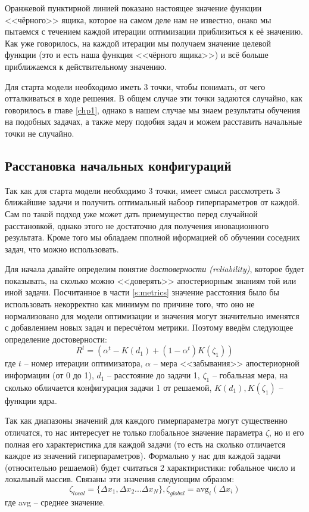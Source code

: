 \documentclass[times,specification,annotation]{itmo-student-thesis}
\begin{document}
	Оранжевой пунктирной линией показано настоящее значение функции <<чёрного>> ящика, которое на самом деле нам не известно, онако мы пытаемся с течением каждой итерации оптимизации приблизиться к её значению. Как уже говорилось, на каждой итерации мы получаем значение целевой функции (это и есть наша функция <<чёрного ящика>>) и всё больше приближаемся к действительному значению. \par
	Для старта модели необходимо иметь 3 точки, чтобы понимать, от чего отталкиваться в ходе решения. В общем случае эти точки задаются случайно, как говорилось в главе \ref{chp1}, однако в нашем случае мы знаем результаты обучения на подобных задачах, а также меру подобия задач и можем расставить начальные точки не случайно.
	\subsection{Расстановка начальных конфигураций}
	Так как для старта модели необходимо 3 точки, имеет смысл рассмотреть 3 ближайшие задачи и получить оптимальный набоор гиперпараметров от каждой. Сам по такой подход уже может дать приемущество перед случайной расстановкой, однако этого не достаточно для получения иновационного результата. Кроме того мы обладаем пполной иформацией об обучении соседних задач, что можно использовать. \par 
	Для начала давайте определим понятие \textit{достоверности (reliability)}, которое будет показывать, на сколько можно <<доверять>> апостериорным знаниям той или иной задачи. Посчитанное в части \ref{s:metrics} значение расстояния было бы использовать некорректно как минимум по причине того, что оно не нормализовано для модели оптимизации и значения могут значительно именятся с добавлением новых задач и пересчётом метрики. Поэтому введём следующее определение достоверности:
	\begin{equation}
	\mathit R^{t}=(\alpha^{t}-K(d_{1})+(1-\alpha^{t})K(\zeta_{1}))
	\label{eq:rel}
	\end{equation}
	где $ t $ -- номер итерации оптимизатора, $ \alpha $ -- мера <<забывания>> апостериорной информации (от 0 до 1), $ d_{1} $ -- расстояние до задачи 1, $ \zeta_{1} $ -- гобальная мера, на сколько обличается конфигурация задачи 1 от решаемой, $ K(d_{1}), K(\zeta_{1})$ -- функции ядра. \par 
	Так как диапазоны значений для каждого гимерпараметра могут существенно отличатся, то нас интересует не только глобальное значение параметра $ \zeta $, но и его полная его характеристика для каждой задачи (то есть на сколько отличается каждое из значений гиперпараметров). Формально у нас для каждой задачи (относительно решаемой) будет считаться 2 характиристики: гобальное число и локальный массив. Связаны эти значения следующим образом: 
	\begin{equation}
	\mathit \zeta_{local} = \{\Delta x_{1}, \Delta x_{2}...\Delta x_{N}\}, \zeta_{global} = \mathrm{avg}_{i}(\Delta x_{i})
	\label{eq:zeta}
	\end{equation}
	где avg -- среднее значение.
	
\end{document}
